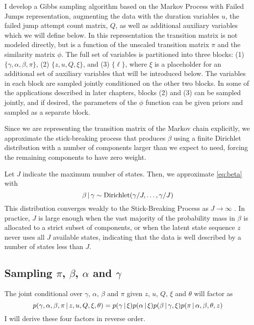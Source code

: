 I develop a Gibbs sampling algorithm based on the Markov Process with
Failed Jumps representation, augmenting the data with the duration
variables $u$, the failed jump attempt count matrix, $Q$, as well as
additional auxiliary variables which we will define below.  In this
representation the transition matrix is not modeled directly, but is a
function of the unscaled transition matrix $\pi$ and the similarity
matrix $\phi$.  The full set of variables is partitioned into three
blocks: (1) $\{\gamma, \alpha, \beta, \pi\}$, (2) $\{z, u, Q, \xi\}$,
and (3) $\{\ell\}$, where $\xi$ is a placeholder for an additional set
of auxiliary variables that will be introduced below.  The variables
in each block are sampled jointly conditioned on the other two blocks.
In some of the applications described in later chapters, blocks (2)
and (3) can be sampled jointly, and if desired, the parameters of the
$\phi$ function can be given priors and sampled as a separate block.

Since we are representing the transition matrix of the Markov chain
explicitly, we approximate the stick-breaking process that produces
$\beta$ using a finite Dirichlet distribution with a number of
components larger than we expect to need, forcing the remaining
components to have zero weight.

Let $J$ indicate the maximum number of states.  Then, we approximate
\eqref{eq:beta} with
\begin{equation}
  \label{eq:28} \beta \, \vert \, \gamma \sim \mathrm{Dirichlet}(\gamma /
J, \dots, \gamma / J)
\end{equation} This distribution converges weakly to the
Stick-Breaking Process as $J \to \infty$ \cite{ishwaran2000markov}.
In practice, $J$ is large enough when the vast majority of the
probability mass in $\beta$ is allocated to a strict subset of
components, or when the latent state sequence $z$ never uses all $J$
available states, indicating that the data is well described by a
number of states less than $J$.

\subsection{Sampling $\pi$, $\beta$, $\alpha$ and $\gamma$}
\label{sec:sampling-pi}

The joint conditional over $\gamma$, $\alpha$, $\beta$ and $\pi$ given
$z$, $u$, $Q$, $\xi$ and $\theta$ will factor as
\begin{equation}
  \label{eq:46} p(\gamma, \alpha, \beta, \pi \, \vert \, z, u, Q, \xi,
\theta) = p(\gamma \, \vert \, \xi) p(\alpha \, \vert \, \xi) p(\beta \, \vert \,
\gamma, \xi) p(\pi \, \vert \, \alpha, \beta, \theta, z)
\end{equation} I will derive these four factors in reverse order.

